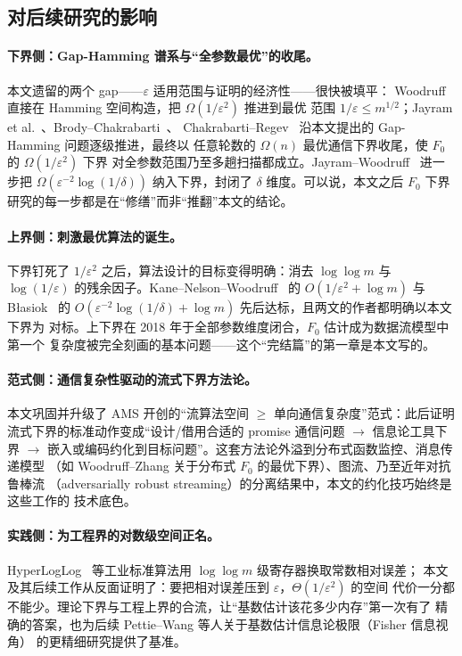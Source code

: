 \documentclass[UTF8, 11pt, a4paper, linestretch=1.15]{ctexart}
\theoremstyle{zhstyle}
\newcommand{\eps}{\varepsilon}
\newcommand{\Fzero}{F_0}
\begin{document}
	\subsection{对后续研究的影响}
	
	\paragraph{下界侧：Gap-Hamming 谱系与“全参数最优”的收尾。}
	本文遗留的两个 gap——$\eps$ 适用范围与证明的经济性——很快被填平：
	Woodruff~\cite{Woo04} 直接在 Hamming 空间构造，把 $\Omega(1/\eps^2)$ 推进到最优
	范围 $1/\eps \leq m^{1/2}$；Jayram et al.~\cite{JKS08}、Brody--Chakrabarti~\cite{BC09}、
	Chakrabarti--Regev~\cite{CR11} 沿本文提出的 Gap-Hamming 问题逐级推进，最终以
	任意轮数的 $\Omega(n)$ 最优通信下界收尾，使 $\Fzero$ 的 $\Omega(1/\eps^2)$ 下界
	对全参数范围乃至多趟扫描都成立。Jayram--Woodruff~\cite{JW13} 进一步把
	$\Omega(\eps^{-2}\log(1/\delta))$ 纳入下界，封闭了 $\delta$ 维度。可以说，本文之后
	$\Fzero$ 下界研究的每一步都是在“修缮”而非“推翻”本文的结论。
	
	\paragraph{上界侧：刺激最优算法的诞生。}
	下界钉死了 $1/\eps^2$ 之后，算法设计的目标变得明确：消去 $\log\log m$ 与
	$\log(1/\eps)$ 的残余因子。Kane--Nelson--Woodruff~\cite{KNW10} 的
	$O(1/\eps^2 + \log m)$ 与 Błasiok~\cite{Bla18} 的
	$O(\eps^{-2}\log(1/\delta) + \log m)$ 先后达标，且两文的作者都明确以本文下界为
	对标。上下界在 2018 年于全部参数维度闭合，$\Fzero$ 估计成为数据流模型中第一个
	复杂度被完全刻画的基本问题——这个“完结篇”的第一章是本文写的。
	
	\paragraph{范式侧：通信复杂性驱动的流式下界方法论。}
	本文巩固并升级了 AMS 开创的“流算法空间 $\geq$ 单向通信复杂度”范式：此后证明
	流式下界的标准动作变成“设计/借用合适的 promise 通信问题 $\to$ 信息论工具下界
	$\to$ 嵌入或编码约化到目标问题”。这套方法论外溢到分布式函数监控、消息传递模型
	（如 Woodruff--Zhang 关于分布式 $\Fzero$ 的最优下界）、图流、乃至近年对抗鲁棒流
	（adversarially robust streaming）的分离结果中，本文的约化技巧始终是这些工作的
	技术底色。
	
	\paragraph{实践侧：为工程界的对数级空间正名。}
	HyperLogLog~\cite{HLL07} 等工业标准算法用 $\log\log m$ 级寄存器换取常数相对误差；
	本文及其后续工作从反面证明了：要把相对误差压到 $\eps$，$\Theta(1/\eps^2)$ 的空间
	代价一分都不能少。理论下界与工程上界的合流，让“基数估计该花多少内存”第一次有了
	精确的答案，也为后续 Pettie--Wang 等人关于基数估计信息论极限（Fisher 信息视角）
	的更精细研究提供了基准。
	
\end{document}
